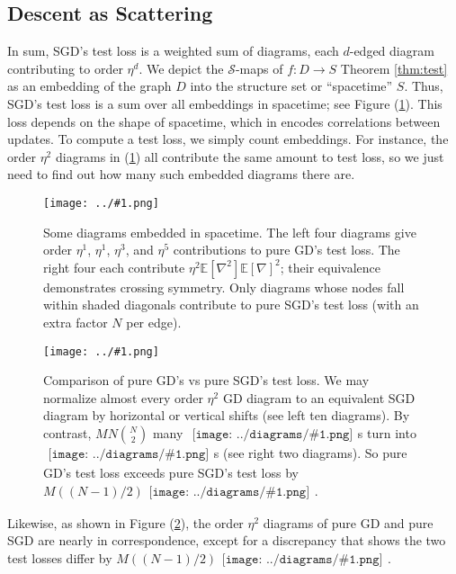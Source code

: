 \documentclass{article}
\newcommand{\Ss}{\mathcal{S}}
\newcommand{\expct}[1]{\mathbb{E}\left[#1\right]}
\newcommand{\plotmoo}[3]{
    \texttt{[image: ../\#1.png]}
}
\newcommand{\sdia}[1]{\begin{gathered}\texttt{[image: ../diagrams/\#1.png]}\end{gathered}}
\begin{document}

    \subsection{Descent as Scattering}
        In sum, SGD's test loss is a weighted sum of diagrams, each $d$-edged
        diagram contributing to order $\eta^d$.  We depict the $\Ss$-maps of
        $f:D\to S$ Theorem \ref{thm:test} as an embedding of the graph $D$ into
        the structure set or ``spacetime'' $S$.  Thus, SGD's test loss is a sum
        over all embeddings in spacetime; see Figure (\ref{fig:spacetime}).
        This loss depends on the shape of spacetime, which in encodes
        correlations between updates.  To compute a test loss, we simply count
        embeddings.  For instance, the order $\eta^2$ diagrams in
        (\ref{fig:spacetime}) all contribute the same amount to test loss, so
        we just need to find out how many such embedded diagrams there are.   
        \begin{figure}[h!] \label{fig:spacetime}
            \centering  
            \plotmoo{diagrams/spacetime}{\columnwidth}{3.0cm}  
            \caption{
                Some diagrams embedded in spacetime.  The left four diagrams
                give order $\eta^1$, $\eta^1$, $\eta^3$, and $\eta^5$
                contributions to pure GD's test loss.  The right four each
                contribute $\eta^2 \expct{\nabla^2} \expct{\nabla}^2$; their
                equivalence demonstrates crossing symmetry.  Only diagrams
                whose nodes fall within shaded diagonals contribute to pure SGD's
                test loss (with an extra factor $N$ per edge). 
            }
        \end{figure}
        \begin{figure}[h!] \label{fig:vsmulti}
            \centering  
            \plotmoo{diagrams/spacetime-b}{\columnwidth}{3.0cm}
            \caption{
                Comparison of pure GD's vs pure SGD's test loss.  We may
                normalize almost every order $\eta^2$ GD diagram to an
                equivalent SGD diagram by horizontal or vertical shifts (see
                left ten diagrams).  By contrast, $MN{N\choose 2}$ many
                $\sdia{(01-2)(01-12)}$s turn into $\sdia{(0-1-2)(01-12)}$s (see
                right two diagrams).  So pure GD's test loss exceeds pure SGD's
                test loss by $M ((N-1)/2) \sdia{c(01-2)(01-12)}$.
            }
        \end{figure}
        Likewise, as shown in Figure (\ref{fig:vsmulti}), the order $\eta^2$
        diagrams of pure GD and pure SGD are nearly in correspondence, except
        for a discrepancy that shows the two test losses differ by $M ((N-1)/2)
        \sdia{c(01-2)(01-12)}$.
    
\end{document}

